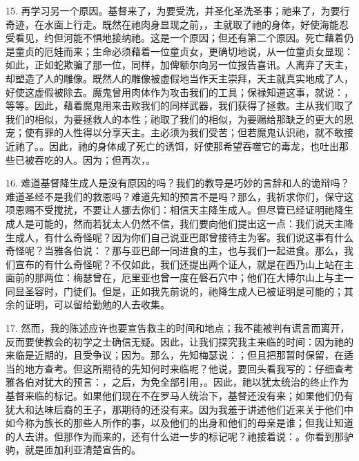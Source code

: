 15. 再学习另一个原因。基督来了，为要受洗，并圣化圣洗圣事；祂来了，为要行奇迹，在水面上行走。既然在祂肉身显现之前，，主就取了祂的身体，好使海能忍受看见，约但河能不惧地接纳祂。这是一个原因；但还有第二个原因。死亡藉着仍是童贞的厄娃而来；生命必须藉着一位童贞女，更确切地说，从一位童贞女显现：如此，正如蛇欺骗了那一位，同样，加俾额尔向另一位报告喜讯。人离弃了天主，却塑造了人的雕像。既然人的雕像被虚假地当作天主崇拜，天主就真实地成了人，好使这虚假被除去。魔鬼曾用肉体作为攻击我们的工具；保禄知道这事，就说：，等等。因此，藉着魔鬼用来击败我们的同样武器，我们获得了拯救。主从我们取了我们的相似，为要拯救人的本性；祂取了我们的相似，为要赐给那缺乏的更大的恩宠；使有罪的人性得以分享天主。主必须为我们受苦；但若魔鬼认识祂，就不敢接近祂了。。因此，祂的身体成了死亡的诱饵，好使那希望吞噬它的毒龙，也吐出那些已被吞吃的人。因为；但再次，。\par

16. 难道基督降生成人是没有原因的吗？我们的教导是巧妙的言辞和人的诡辩吗？难道圣经不是我们的救恩吗？难道先知的预言不是吗？那么，我祈求你们，保守这项恩赐不受搅扰，不要让人挪去你们：相信天主降生成人。但尽管已经证明祂降生成人是可能的，然而若犹太人仍然不信，我们要向他们提出这一点：我们说天主降生成人，有什么奇怪呢？因为你们自己说亚巴郎曾接待主为客。我们说这事有什么奇怪呢？当雅各伯说：？那与亚巴郎一同进食的主，也与我们一起进食。那么，我们宣布的有什么奇怪呢？不仅如此，我们还提出两个证人，就是在西乃山上站在主面前的那两位：梅瑟曾在，厄里亚也曾一度在磐石穴中；他们在大博尔山上与主一同显圣容时，门徒们。但是，正如我先前说的，祂降生成人已被证明是可能的；其余的证明，可以留给勤勉的人去收集。\par

17. 然而，我的陈述应许也要宣告救主的时间和地点；我不能被判有谎言而离开，反而要使教会的初学之士确信无疑。因此，让我们探究我主来临的时间：因为祂的来临是近期的，且受争议；因为。那么，先知梅瑟说：；但且把那暂时保留，在适当的地方查考。但这所期待的先知何时来临呢？他说，要回头看我写的：仔细查考雅各伯对犹大的预言：，之后，为免全部引用，。因此，祂以犹太统治的终止作为基督来临的标记。如果他们现在不在罗马人统治下，基督还没有来；如果他们仍有犹大和达味后裔的王子，那期待的还没有来。因为我羞于讲述他们近来关于他们中如今称为族长的那些人所作的事，以及他们的出身和他们的母亲是谁；但我让知道的人去讲。但那作为而来的，还有什么进一步的标记呢？祂接着说：。你看到那驴驹，就是匝加利亚清楚宣告的。\par

